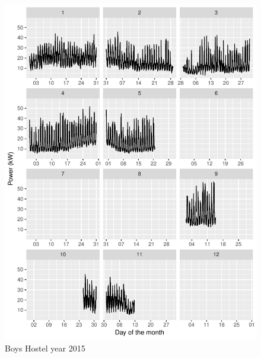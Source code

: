 \documentclass[11pt, oneside]{article}   	%
\begin{document}
\begin{figure}
\includegraphics[keepaspectratio]{boys_hostel_year2015.pdf}
\caption{Boys Hostel year 2015}
\end{figure}
\end{document}
